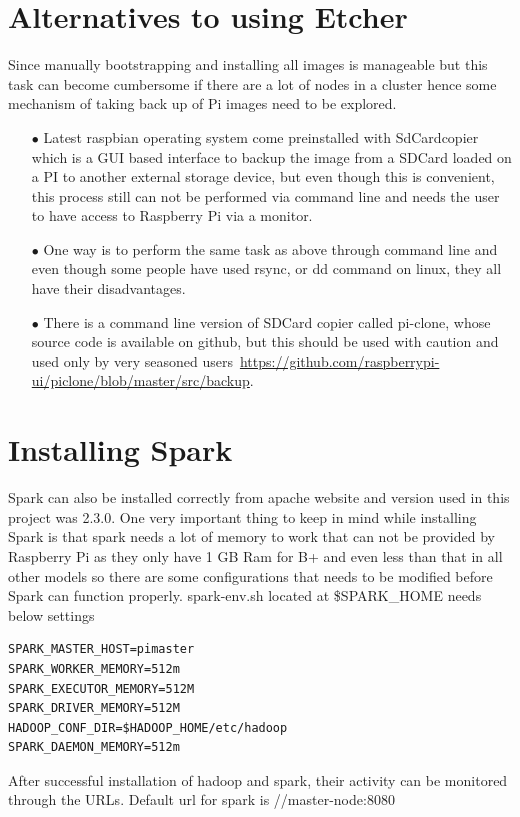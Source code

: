 \section{Alternatives to using Etcher}
Since manually bootstrapping and installing all images is manageable but this task can become cumbersome if there are a lot of nodes in a cluster hence some mechanism of taking back up of Pi images need to be explored.
\begin{itemize}
	\item[$\bullet$] Latest raspbian operating system come preinstalled with SdCardcopier which is a GUI based interface to backup the image from a SDCard loaded on a PI to another external storage device, but even though this is convenient, this process still can not be performed via command line and needs the user to have access to Raspberry Pi via a monitor.
	\item[$\bullet$] One way is to perform the same task as above through command line and even though some people have used rsync, or dd command on linux, they all have their disadvantages.
	\item[$\bullet$] There is a command line version of SDCard copier called pi-clone, whose source code is available on github, but this should be used with caution and used only by very seasoned users~\url{https://github.com/raspberrypi-ui/piclone/blob/master/src/backup}. 
\end{itemize}

\section{Installing Spark}
Spark can also be installed correctly from apache website and version used in this project was 2.3.0. One very important thing to keep in mind while installing Spark is that spark needs a lot of memory to work that can not be provided by Raspberry Pi as they only have 1 GB Ram for B+ and even less than that in all other models so there are some configurations that needs to be modified before Spark can function properly.
spark-env.sh located at \$SPARK\_HOME needs below settings

\begin{verbatim}
SPARK_MASTER_HOST=pimaster
SPARK_WORKER_MEMORY=512m
SPARK_EXECUTOR_MEMORY=512M
SPARK_DRIVER_MEMORY=512M
HADOOP_CONF_DIR=$HADOOP_HOME/etc/hadoop
SPARK_DAEMON_MEMORY=512m
\end{verbatim}

After successful installation of hadoop and spark, their activity can be monitored through the URLs.
Default url for spark is 
//master-node:8080

